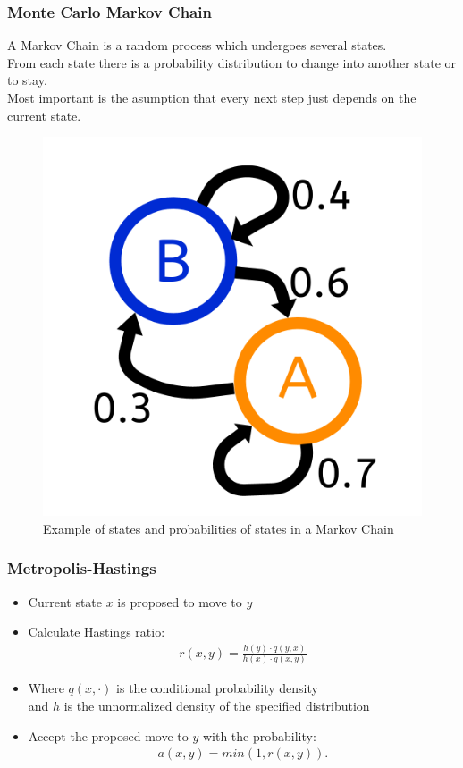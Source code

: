 \documentclass{beamer}
\begin{document}
\begin{frame}
 \frametitle{Monte Carlo Markov Chain}
 A Markov Chain is a random process which undergoes several states. \\
 From each state there is a probability distribution to change into another state or to stay. \\
 Most important is the asumption that every next step just depends on the current state.
 \begin{figure}
  \includegraphics[width=0.3\linewidth]{figures/MCMC_Chain}
  \caption{Example of states and probabilities of states in a Markov Chain}
 \end{figure}
\end{frame}




\begin{frame}
 \frametitle{Metropolis-Hastings}
 \begin{itemize}
  \item Current state $x$ is proposed to move to $y$
  \item Calculate Hastings ratio: \\
        \begin{align}
         r(x,y) = \frac{h(y) \cdot q(y,x)} {h(x) \cdot q(x,y)} \label{eq:r(x,y)}
        \end{align}
  \item Where $q(x,\cdot)$ is the conditional probability density \\
        and $h$ is the unnormalized density of the specified distribution
  \item Accept the proposed move to $y$ with the probability: \\
        \begin{align}
         a(x,y) = min(1,r(x,y)).
        \end{align}
 \end{itemize}
\end{frame}
\end{document}
